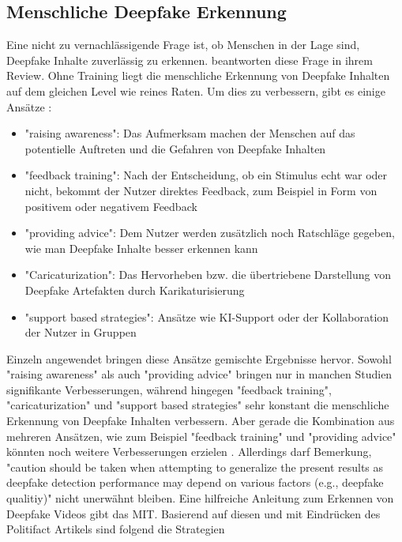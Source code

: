 \subsection{Menschliche Deepfake Erkennung}
Eine nicht zu vernachlässigende Frage ist, ob Menschen in der Lage sind, Deepfake Inhalte zuverlässig zu erkennen. 
\textcite{dielHumanPerformanceDetecting2024} beantworten diese Frage in ihrem Review. 
Ohne Training liegt die menschliche Erkennung von Deepfake Inhalten auf dem gleichen Level wie reines Raten. 
Um dies zu verbessern, gibt es einige Ansätze \cite{dielHumanPerformanceDetecting2024}:
\begin{itemize}
    \item "raising awareness": Das Aufmerksam machen der Menschen auf das potentielle Auftreten und die Gefahren von Deepfake Inhalten
    \item "feedback training": Nach der Entscheidung, ob ein Stimulus echt war oder nicht, bekommt der Nutzer direktes Feedback, 
    zum Beispiel in Form von positivem oder negativem Feedback
    \item "providing advice": Dem Nutzer werden zusätzlich noch Ratschläge gegeben, wie man Deepfake Inhalte besser erkennen kann
    \item "Caricaturization": Das Hervorheben bzw. die übertriebene Darstellung von Deepfake Artefakten durch Karikaturisierung
    \item "support based strategies": Ansätze wie KI-Support oder der Kollaboration der Nutzer in Gruppen
\end{itemize}
Einzeln angewendet bringen diese Ansätze gemischte Ergebnisse hervor. 
Sowohl "raising awareness" als auch "providing advice" bringen nur in manchen Studien signifikante Verbesserungen, 
während hingegen "feedback training", "caricaturization" und "support based strategies" sehr konstant die menschliche Erkennung von Deepfake Inhalten verbessern. 
Aber gerade die Kombination aus mehreren Ansätzen, wie zum Beispiel "feedback training" und "providing advice" könnten noch weitere Verbesserungen erzielen \cite{dielHumanPerformanceDetecting2024}. 
Allerdings darf \textcite{dielHumanPerformanceDetecting2024} Bemerkung, "caution should be taken when attempting to generalize the present results 
as deepfake detection performance may depend on various factors (e.g., deepfake qualitiy)" \cite[S.9]{dielHumanPerformanceDetecting2024} nicht unerwähnt bleiben.
Eine hilfreiche Anleitung zum Erkennen von Deepfake Videos gibt das MIT\cite{ProjectOverviewDetect}.
Basierend auf diesen und mit Eindrücken des Politifact \cite{settlesPolitiFactDemystifiesDeepfake} Artikels sind folgend die Strategien 
